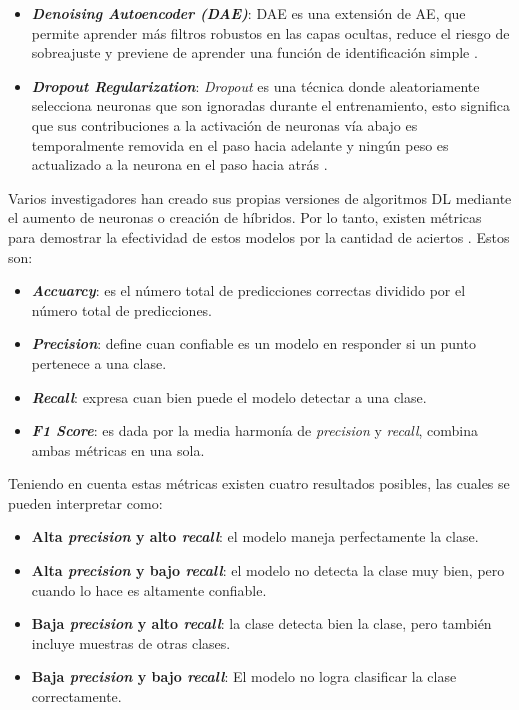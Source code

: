 \begin{itemize}
  	\item \textit{\textbf{Denoising Autoencoder (DAE)}}: DAE es una extensi\'{o}n de AE, que permite aprender m\'{a}s filtros robustos en las capas ocultas, reduce el riesgo de sobreajuste y previene de aprender una funci\'{o}n de identificaci\'{o}n simple \cite{19}.
  	\item \textit{\textbf{Dropout Regularization}}: \textit{Dropout} es una t\'{e}cnica donde aleatoriamente selecciona neuronas que son ignoradas durante el entrenamiento, esto significa que sus contribuciones a la activaci\'{o}n de neuronas v\'{i}a abajo es temporalmente removida en el paso hacia adelante y ning\'{u}n peso es actualizado a la neurona en el paso hacia atr\'{a}s \cite{20}.
  \end{itemize}

  Varios investigadores han creado sus propias versiones de algoritmos DL mediante el aumento de neuronas o creaci\'{o}n de h\'{i}bridos. Por lo tanto, existen m\'{e}tricas para demostrar la efectividad de estos modelos por la cantidad de aciertos \cite{21}. Estos son:
  
  \begin{itemize}
  	\item \textit{\textbf{Accuarcy}}: es el n\'{u}mero total de predicciones correctas dividido por el n\'{u}mero total de predicciones.
  	\item \textit{\textbf{Precision}}: define cuan confiable es un modelo en responder si un punto pertenece a una clase.
  	\item \textit{\textbf{Recall}}: expresa cuan bien puede el modelo detectar a una clase.
  	\item \textit{\textbf{F1 Score}}: es dada por la media harmon\'{i}a de \textit{precision} y \textit{recall}, combina ambas m\'{e}tricas en una sola.
  \end{itemize}

  Teniendo en cuenta estas m\'{e}tricas existen cuatro resultados posibles, las cuales se pueden interpretar como:
  
  \begin{itemize}
  	\item \textbf{Alta \textit{precision} y alto \textit{recall}}: el modelo maneja perfectamente la clase.
  	\item \textbf{Alta \textit{precision} y bajo \textit{recall}}: el modelo no detecta la clase muy bien, pero cuando lo hace es altamente confiable.
  	\item \textbf{Baja \textit{precision} y alto \textit{recall}}: la clase detecta bien la clase, pero tambi\'{e}n incluye muestras de otras clases.
  	\item \textbf{Baja \textit{precision} y bajo \textit{recall}}: El modelo no logra clasificar la clase correctamente.
  \end{itemize}

